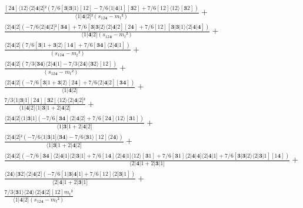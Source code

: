 \documentclass[varwidth, border=5pt]{standalone}
\begin{document}
\begin{my}
$\begin{gathered}
\scriptscriptstyle\frac{[2𝟒]⟨12⟩⟨2|𝟒|2]²(7/6[𝟑|𝟑|1⟩[12]-7/6⟨1|𝟒|1][𝟑2]+7/6[12]⟨12⟩[𝟑2])}{⟨1|𝟒|2]²(s_{12𝟒}-m_t²)} +\\
\scriptscriptstyle\frac{⟨2|𝟒|2](-7/6⟨2|𝟒|2]²[𝟑𝟒]+7/6[𝟑|𝟑|2⟩⟨2|𝟒|2][2𝟒]+7/6[12][𝟑|𝟑|1⟩⟨2|𝟒|𝟒])}{⟨1|𝟒|2](s_{12𝟒}-m_t²)} +\\
\scriptscriptstyle\frac{⟨2|𝟒|2](7/6[𝟑|1+𝟑|2⟩[1𝟒]+7/6[𝟑𝟒]⟨2|𝟒|1])}{(s_{12𝟒}-m_t²)} +\\
\scriptscriptstyle\frac{⟨2|𝟒|2](7/3⟨𝟑𝟒⟩⟨2|𝟒|1]-7/3⟨2𝟒⟩⟨𝟑2⟩[12])}{(s_{12𝟒}-m_t²)} +\\
\scriptscriptstyle\frac{⟨2|𝟒|2](-7/6[𝟑|1+𝟑|2⟩[2𝟒]+7/6⟨2|𝟒|2][𝟑𝟒])}{⟨1|𝟒|2]} +\\
\scriptscriptstyle\frac{7/3⟨1|𝟑|1][2𝟒][𝟑2]⟨12⟩⟨2|𝟒|2]²}{⟨1|𝟒|2]⟨1|𝟑|1+2|𝟒|2]} +\\
\scriptscriptstyle\frac{⟨2|𝟒|2]⟨1|𝟑|1](-7/6[𝟑𝟒]⟨2|𝟒|2]+7/6[2𝟒]⟨12⟩[𝟑1])}{⟨1|𝟑|1+2|𝟒|2]} +\\
\scriptscriptstyle\frac{⟨2|𝟒|2]²(-7/6⟨1|𝟑|1]⟨𝟑𝟒⟩-7/6⟨𝟑1⟩[12]⟨2𝟒⟩)}{⟨1|𝟑|1+2|𝟒|2]} +\\
\scriptscriptstyle\frac{⟨2|𝟒|2](-7/6[𝟑𝟒]⟨2|𝟒|1]⟨2|𝟑|1]+7/6[1𝟒]⟨2|𝟒|1]⟨12⟩[𝟑1]+7/6[𝟑1]⟨2|𝟒|𝟒]⟨2|𝟒|1]+7/6[𝟑|𝟑|2⟩⟨2|𝟑|1][1𝟒])}{⟨2|𝟒|1+2|𝟑|1]} +\\
\scriptscriptstyle\frac{⟨2𝟒⟩⟨𝟑2⟩⟨2|𝟒|2](-7/6[1|𝟑|𝟒|1]+7/6[12]⟨2|𝟑|1])}{⟨2|𝟒|1+2|𝟑|1]} +\\
\scriptscriptstyle\frac{7/3⟨𝟑1⟩⟨2𝟒⟩⟨2|𝟒|2][12]m_t²}{⟨1|𝟒|2](s_{12𝟒}-m_t²)} \phantom{+}
\end{gathered}$
\end{my}
\end{document}
